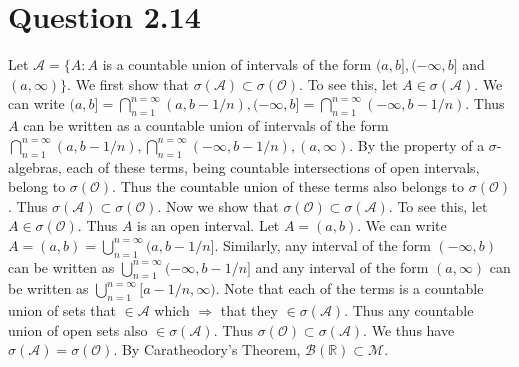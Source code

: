 \documentclass{article}
\begin{document}
  \section*{Question 2.14}
    Let $\mathcal A = \{A: A$ is a countable union of intervals of the form $(a,b], (-\infty, b]$ and $(a, \infty)\}$. We first show that $\sigma(\mathcal A) \subset \sigma(\mathcal O)$. 
    \newline
    \newline
    To see this,
    let $A \in \sigma(\mathcal A)$. We can write $(a,b] = \bigcap_{n=1}^{n=\infty}(a, b - 1/n), (- \infty, b] = \bigcap_{n=1}^{n=\infty}(-\infty, b- 1/n)$. Thus $A$ can be written as a countable union of
    intervals of the form $\bigcap_{n=1}^{n=\infty}(a, b-1/n), \bigcap_{n=1}^{n=\infty}(-\infty, b-1/n), (a, \infty)$. 
    \newline
    \newline
    By the property of a $\sigma$- algebras, each of these terms, being countable intersections of
    open intervals, belong to $\sigma(\mathcal O)$. Thus the countable union of these terms also belongs to $\sigma(\mathcal O)$. Thus $\sigma(\mathcal A) \subset \sigma(\mathcal O)$.
    \newline
    \linebreak
    Now we show that $\sigma(\mathcal O) \subset \sigma(\mathcal A)$. To see this, let $A \in \sigma(\mathcal O)$. Thus $A$ is an open interval. Let $A = (a,b)$. We can write $A = (a,b) = \bigcup_{n=1}^{n=\infty}(a, b-1/n]$. Similarly,
    any interval of the form $(-\infty, b)$ can be written as $\bigcup_{n=1}^{n=\infty}(-\infty, b-1/n]$ and any interval of the form $(a, \infty)$ can be written as $\bigcup_{n=1}^{n=\infty}[a-1/n, \infty)$.
    \newline
    \newline
    Note that each of the terms is a countable union of sets that $\in \mathcal A$ which $\Rightarrow$ that they $\in \sigma(\mathcal A)$. Thus any countable union of open sets also $\in \sigma(\mathcal A)$.
    Thus $\sigma(\mathcal O) \subset \sigma(\mathcal A)$.
    \newline
    \newline
    We thus have $\sigma(\mathcal A) = \sigma(\mathcal O)$. By Caratheodory's Theorem, $\mathcal B(\mathbb R) \subset \mathcal M$.
\end{document}
